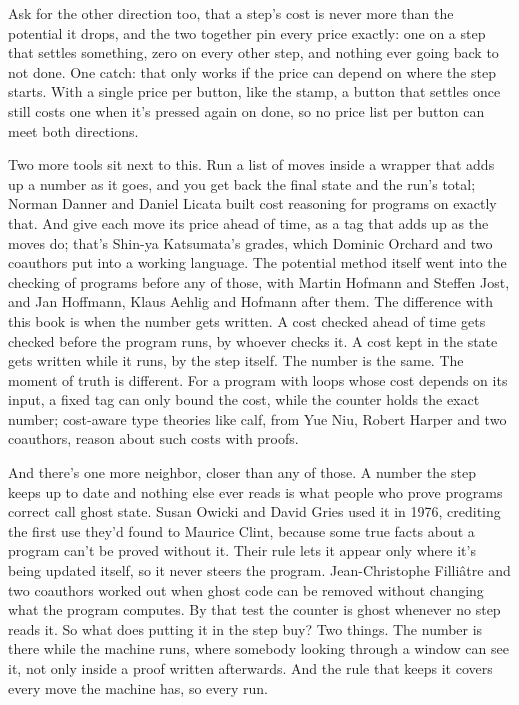 \documentclass[11pt,twoside]{article}
\theoremstyle{thielethm}
\theoremstyle{thieledef}
\theoremstyle{thieledef}
\theoremstyle{thieledef}
\theoremstyle{thielethm}
\theoremstyle{thieleobs}
\theoremstyle{thielethm}
\begin{document}
Ask for the other direction too, that a step's cost is never more than the potential it drops, and the two together pin every price exactly: one on a step that settles something, zero on every other step, and nothing ever going back to not done. One catch: that only works if the price can depend on where the step starts. With a single price per button, like the stamp, a button that settles once still costs one when it's pressed again on done, so no price list per button can meet both directions.

Two more tools sit next to this. Run a list of moves inside a wrapper that adds up a number as it goes, and you get back the final state and the run's total; Norman Danner and Daniel Licata built cost reasoning for programs on exactly that. And give each move its price ahead of time, as a tag that adds up as the moves do; that's Shin-ya Katsumata's grades, which Dominic Orchard and two coauthors put into a working language. The potential method itself went into the checking of programs before any of those, with Martin Hofmann and Steffen Jost, and Jan Hoffmann, Klaus Aehlig and Hofmann after them. The difference with this book is when the number gets written. A cost checked ahead of time gets checked before the program runs, by whoever checks it. A cost kept in the state gets written while it runs, by the step itself. The number is the same. The moment of truth is different. For a program with loops whose cost depends on its input, a fixed tag can only bound the cost, while the counter holds the exact number; cost-aware type theories like calf, from Yue Niu, Robert Harper and two coauthors, reason about such costs with proofs.

And there's one more neighbor, closer than any of those. A number the step keeps up to date and nothing else ever reads is what people who prove programs correct call ghost state. Susan Owicki and David Gries used it in 1976, crediting the first use they'd found to Maurice Clint, because some true facts about a program can't be proved without it. Their rule lets it appear only where it's being updated itself, so it never steers the program. Jean-Christophe Filliâtre and two coauthors worked out when ghost code can be removed without changing what the program computes. By that test the counter is ghost whenever no step reads it. So what does putting it in the step buy? Two things. The number is there while the machine runs, where somebody looking through a window can see it, not only inside a proof written afterwards. And the rule that keeps it covers every move the machine has, so every run.
\end{document}
